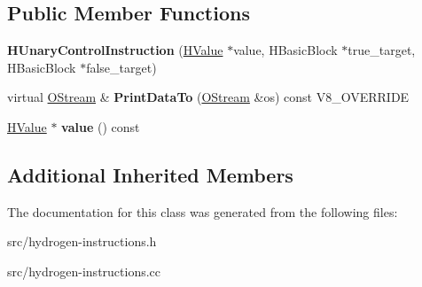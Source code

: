 \subsection*{Public Member Functions}
\begin{DoxyCompactItemize}
\item 
\hypertarget{classv8_1_1internal_1_1_h_unary_control_instruction_ab4ddc5db204a0f1eab21b57189dea958}{}{\bfseries H\+Unary\+Control\+Instruction} (\hyperlink{classv8_1_1internal_1_1_h_value}{H\+Value} $\ast$value, H\+Basic\+Block $\ast$true\+\_\+target, H\+Basic\+Block $\ast$false\+\_\+target)\label{classv8_1_1internal_1_1_h_unary_control_instruction_ab4ddc5db204a0f1eab21b57189dea958}

\item 
\hypertarget{classv8_1_1internal_1_1_h_unary_control_instruction_a36c2722a8b0a73511e78423b5ca4c117}{}virtual \hyperlink{classv8_1_1internal_1_1_o_stream}{O\+Stream} \& {\bfseries Print\+Data\+To} (\hyperlink{classv8_1_1internal_1_1_o_stream}{O\+Stream} \&os) const V8\+\_\+\+O\+V\+E\+R\+R\+I\+D\+E\label{classv8_1_1internal_1_1_h_unary_control_instruction_a36c2722a8b0a73511e78423b5ca4c117}

\item 
\hypertarget{classv8_1_1internal_1_1_h_unary_control_instruction_a03e228936bec17339a767bef42537821}{}\hyperlink{classv8_1_1internal_1_1_h_value}{H\+Value} $\ast$ {\bfseries value} () const \label{classv8_1_1internal_1_1_h_unary_control_instruction_a03e228936bec17339a767bef42537821}

\end{DoxyCompactItemize}
\subsection*{Additional Inherited Members}


The documentation for this class was generated from the following files\+:\begin{DoxyCompactItemize}
\item 
src/hydrogen-\/instructions.\+h\item 
src/hydrogen-\/instructions.\+cc\end{DoxyCompactItemize}
